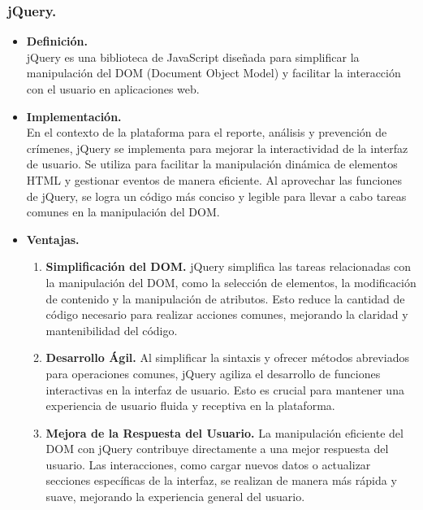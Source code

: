 \documentclass{article}
\begin{document}
        \subsubsection{jQuery.}
            \begin{itemize}
                \item \textbf{Definición.}\\
                jQuery es una biblioteca de JavaScript diseñada para simplificar la manipulación del DOM (Document Object Model) y facilitar la interacción con el usuario en aplicaciones web.

                \item \textbf{Implementación.}\\
                En el contexto de la plataforma para el reporte, análisis y prevención de crímenes, jQuery se implementa para mejorar la interactividad de la interfaz de usuario. Se utiliza para facilitar la manipulación dinámica de elementos HTML y gestionar eventos de manera eficiente. Al aprovechar las funciones de jQuery, se logra un código más conciso y legible para llevar a cabo tareas comunes en la manipulación del DOM.

                \item \textbf{Ventajas.}
                \begin{enumerate}
                    \item \textbf{Simplificación del DOM.}
                    jQuery simplifica las tareas relacionadas con la manipulación del DOM, como la selección de elementos, la modificación de contenido y la manipulación de atributos. Esto reduce la cantidad de código necesario para realizar acciones comunes, mejorando la claridad y mantenibilidad del código.

                    \item \textbf{Desarrollo Ágil.}
                    Al simplificar la sintaxis y ofrecer métodos abreviados para operaciones comunes, jQuery agiliza el desarrollo de funciones interactivas en la interfaz de usuario. Esto es crucial para mantener una experiencia de usuario fluida y receptiva en la plataforma.

                    \item \textbf{Mejora de la Respuesta del Usuario.}
                    La manipulación eficiente del DOM con jQuery contribuye directamente a una mejor respuesta del usuario. Las interacciones, como cargar nuevos datos o actualizar secciones específicas de la interfaz, se realizan de manera más rápida y suave, mejorando la experiencia general del usuario.


\end{enumerate}
\end{itemize}
\end{document}
